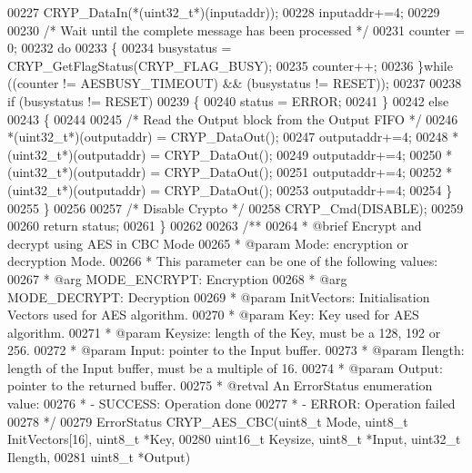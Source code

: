 \begin{DoxyCode}
00227     CRYP\_DataIn(*(uint32\_t*)(inputaddr));
00228     inputaddr+=4;
00229 
00230     \textcolor{comment}{/* Wait until the complete message has been processed */}
00231     counter = 0;
00232     \textcolor{keywordflow}{do}
00233     \{
00234       busystatus = CRYP\_GetFlagStatus(CRYP_FLAG_BUSY);
00235       counter++;
00236     \}\textcolor{keywordflow}{while} ((counter != AESBUSY_TIMEOUT) && (busystatus != RESET));
00237 
00238     \textcolor{keywordflow}{if} (busystatus != RESET)
00239    \{
00240        status = ERROR;
00241     \}
00242     \textcolor{keywordflow}{else}
00243     \{
00244 
00245       \textcolor{comment}{/* Read the Output block from the Output FIFO */}
00246       *(uint32\_t*)(outputaddr) = CRYP\_DataOut();
00247       outputaddr+=4;
00248       *(uint32\_t*)(outputaddr) = CRYP\_DataOut();
00249       outputaddr+=4;
00250       *(uint32\_t*)(outputaddr) = CRYP\_DataOut();
00251       outputaddr+=4;
00252       *(uint32\_t*)(outputaddr) = CRYP\_DataOut();
00253       outputaddr+=4;
00254     \}
00255   \}
00256 
00257   \textcolor{comment}{/* Disable Crypto */}
00258   CRYP_Cmd(DISABLE);
00259 
00260   \textcolor{keywordflow}{return} status;
00261 \}
00262 
00263 \textcolor{comment}{/**}
00264 \textcolor{comment}{  * @brief  Encrypt and decrypt using AES in CBC Mode}
00265 \textcolor{comment}{  * @param  Mode: encryption or decryption Mode.}
00266 \textcolor{comment}{  *          This parameter can be one of the following values:}
00267 \textcolor{comment}{  *            @arg MODE\_ENCRYPT: Encryption}
00268 \textcolor{comment}{  *            @arg MODE\_DECRYPT: Decryption}
00269 \textcolor{comment}{  * @param  InitVectors: Initialisation Vectors used for AES algorithm.}
00270 \textcolor{comment}{  * @param  Key: Key used for AES algorithm.}
00271 \textcolor{comment}{  * @param  Keysize: length of the Key, must be a 128, 192 or 256.}
00272 \textcolor{comment}{  * @param  Input: pointer to the Input buffer.}
00273 \textcolor{comment}{  * @param  Ilength: length of the Input buffer, must be a multiple of 16.}
00274 \textcolor{comment}{  * @param  Output: pointer to the returned buffer.}
00275 \textcolor{comment}{  * @retval An ErrorStatus enumeration value:}
00276 \textcolor{comment}{  *          - SUCCESS: Operation done}
00277 \textcolor{comment}{  *          - ERROR: Operation failed}
00278 \textcolor{comment}{  */}
00279 ErrorStatus CRYP_AES_CBC(uint8\_t Mode, uint8\_t InitVectors[16], uint8\_t *Key,
00280                          uint16\_t Keysize, uint8\_t *Input, uint32\_t Ilength,
00281                          uint8\_t *Output)

\end{DoxyCode}
